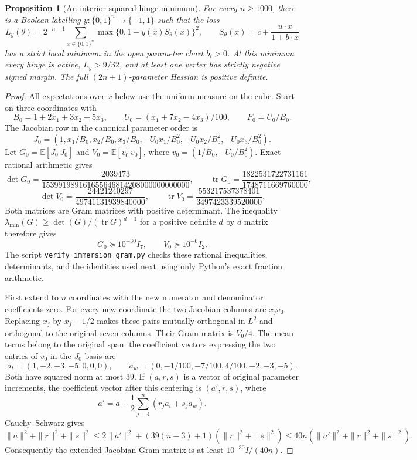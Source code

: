 \documentclass[11pt]{article}
\newtheorem{proposition}{Proposition}
\newcommand{\Qn}{\{0,1\}^n}
\begin{document}
\begin{proposition}[An interior squared-hinge minimum]
For every $n\ge1000$, there is a Boolean labelling $y:\Qn\to\{-1,1\}$
such that the loss
\[
 L_y(\theta)=2^{-n-1}\sum_{x\in\Qn}
       \max\{0,1-y(x)S_\theta(x)\}^2,
 \qquad S_\theta(x)=c+\frac{u\cdot x}{1+b\cdot x}
\]
has a strict local minimum in the open parameter chart $b_i>0$.
At this minimum every hinge is active, $L_y>9/32$, and at least one
vertex has strictly negative signed margin. The full $(2n+1)$-parameter
Hessian is positive definite.
\end{proposition}
\begin{proof}
All expectations over $x$ below use the uniform measure on the cube.
Start on three coordinates with
\[
 B_0=1+2x_1+3x_2+5x_3,\qquad
 U_0=(x_1+7x_2-4x_3)/100,\qquad F_0=U_0/B_0.
\]
The Jacobian row in the canonical parameter order is
\[
 J_0=(1,x_1/B_0,x_2/B_0,x_3/B_0,
              -U_0x_1/B_0^2,-U_0x_2/B_0^2,-U_0x_3/B_0^2).
\]
Let $G_0=\mathbb E[J_0^{\top}J_0]$ and
$V_0=\mathbb E[v_0^{\top}v_0]$, where
$v_0=(1/B_0,-U_0/B_0^2)$. Exact rational arithmetic gives
\[
 \det G_0=\frac{2039473}{153991989161655646814208000000000000},\qquad
 \operatorname{tr}G_0=\frac{1822531722731161}{1748711669760000},
\]
\[
 \det V_0=\frac{24421240297}{49741131939840000},\qquad
 \operatorname{tr}V_0=\frac{553217537378401}{3497423339520000}.
\]
Both matrices are Gram matrices with positive determinant. The inequality
$\lambda_{\min}(G)\ge\det(G)/(\operatorname{tr}G)^{d-1}$ for a positive
definite $d$ by $d$ matrix therefore gives
\[
 G_0\succeq10^{-30}I_7,\qquad V_0\succeq10^{-6}I_2.
\]
The script \texttt{verify\_immersion\_gram.py} checks these rational
inequalities, determinants, and the identities used next using only
Python's exact fraction arithmetic.

First extend to $n$ coordinates with the new numerator and denominator
coefficients zero. For every new coordinate the two Jacobian columns
are $x_jv_0$. Replacing $x_j$ by $x_j-1/2$ makes these pairs mutually
orthogonal in $L^2$ and orthogonal to the original seven columns.
Their Gram matrix is $V_0/4$. The mean terms belong to the original
span: the coefficient vectors expressing the two entries of $v_0$
in the $J_0$ basis are
\[
 a_t=(1,-2,-3,-5,0,0,0),\qquad
 a_w=(0,-1/100,-7/100,4/100,-2,-3,-5).
\]
Both have squared norm at most $39$. If $(a,r,s)$ is a vector of
original parameter increments, the coefficient vector after this
centering is $(a',r,s)$, where
\[
 a'=a+\frac12\sum_{j=4}^n(r_ja_t+s_ja_w).
\]
Cauchy--Schwarz gives
\[
 \|a\|^2+\|r\|^2+\|s\|^2
 \le 2\|a'\|^2+(39(n-3)+1)(\|r\|^2+\|s\|^2)
 \le40n(\|a'\|^2+\|r\|^2+\|s\|^2).
\]
Consequently the extended Jacobian Gram matrix is at least
$10^{-30}I/(40n)$.


\end{proof}
\end{document}
